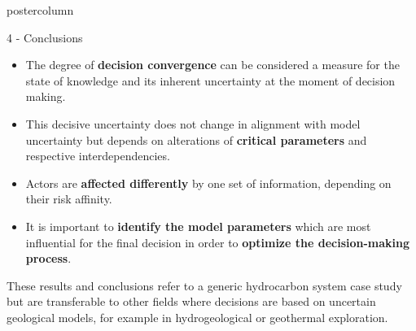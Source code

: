 \documentclass{beamer}
\begin{document}
\begin{frame}
\begin{columns}
\begin{column}{.249\textwidth}
\begin{beamercolorbox}[center]{postercolumn}
\begin{minipage}{.98\textwidth}
{\begin{myblock}{4 - Conclusions}
\begin{itemize}
\item The degree of \textbf{decision convergence} can be considered a measure for the state of knowledge and its inherent uncertainty at the moment of decision making.
\item This decisive uncertainty does not change in alignment with model uncertainty but depends on alterations of \textbf{critical parameters} and respective interdependencies.
\item Actors are \textbf{affected differently} by one set of information, depending on their risk affinity.
\item It is important to \textbf{identify the model parameters} which are most influential for the final decision in order to
\textbf{optimize the decision-making process}.
\end{itemize}
These results and conclusions refer to a generic hydrocarbon system case study but are transferable to other fields where decisions
are based on uncertain geological models, for example in hydrogeological or geothermal exploration.

\end{myblock}}
\end{minipage}
\end{beamercolorbox}
\end{column}
\end{columns}
\end{frame}
\end{document}
